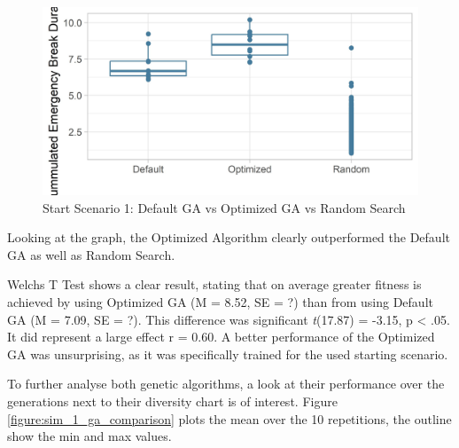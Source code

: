 \begin{figure}[ht] 
	\label{figure:sim_1_comparison}
	\includegraphics[width=1\linewidth]{simulations/evaluation/plots/sim_1_comparison}
	\caption{Start Scenario 1: Default GA vs Optimized GA vs Random Search}
\end{figure}

Looking at the graph, the Optimized Algorithm clearly outperformed the Default GA as well as Random Search.

Welchs T Test shows a clear result, stating that on average greater fitness is achieved by using Optimized GA (M = 8.52, SE = ?) than from using Default GA (M = 7.09, SE = ?). This difference was significant \textit{t}(17.87) = -3.15, p < .05. It did represent a large effect r = 0.60.
A better performance of the Optimized GA was unsurprising, as it was specifically trained for the used starting scenario.

To further analyse both genetic algorithms, a look at their performance over the generations next to their diversity chart is of interest. Figure \ref{figure:sim_1_ga_comparison} plots the mean over the 10 repetitions, the outline show the min and max values.

